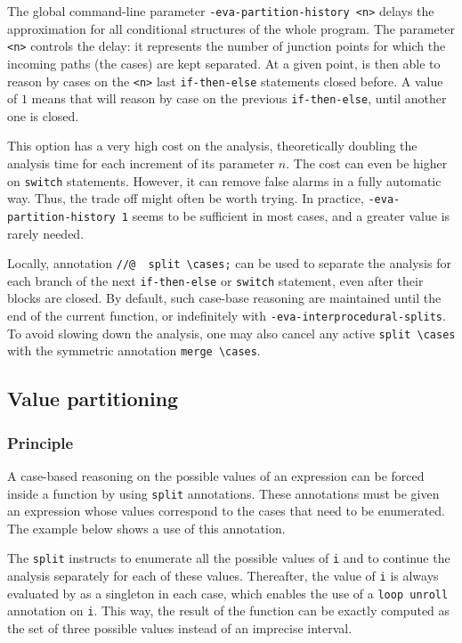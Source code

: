 \documentclass{frama-c-book}
\begin{document}
The global command-line parameter \lstinline|-eva-partition-history <n>|
delays the approximation for all conditional structures of the whole
program. The parameter \lstinline|<n>| controls the delay:
it represents the number of junction points for which the incoming
paths (the cases) are kept separated. At a given point, \Eva{} is then able to
reason by cases on the \lstinline|<n>| last \lstinline|if-then-else| statements
closed before.
A value of $1$ means that \Eva{} will reason by
case on the previous \lstinline|if-then-else|, until another one is closed.

This option has a very high cost on the analysis, theoretically doubling the
analysis time for each increment of its parameter $n$.
The cost can even be higher on \lstinline|switch| statements.
However, it can remove false alarms in a fully automatic way. Thus,
the trade off might often be worth trying.
In practice, \lstinline|-eva-partition-history 1| seems to be sufficient in
most cases, and a greater value is rarely needed.

Locally, annotation \lstinline|//@  split \cases;| can be used to separate the
analysis for each branch of the next \lstinline|if-then-else| or
\lstinline|switch| statement, even after their blocks are closed.
By default, such case-base reasoning are maintained until the end of the current
function, or indefinitely with \lstinline|-eva-interprocedural-splits|.
To avoid slowing down the analysis, one may also cancel any active
\lstinline|split \cases| with the symmetric annotation \lstinline|merge \cases|.

\subsection{Value partitioning}
\label{value-partitioning}

\subsubsection{Principle}

A case-based reasoning on the possible values of an expression can be forced
inside a function by using \lstinline|split| annotations.  These annotations
must be given an expression whose values correspond to the cases that need to be
enumerated. The example below shows a use of this annotation.


The \lstinline|split| instructs \Eva{} to enumerate all the possible
values of \lstinline|i| and to continue the analysis separately for
each of these values. Thereafter, the value of \lstinline|i| is always
evaluated by \Eva{} as a singleton in each case, which enables the use of a
\lstinline|loop unroll| annotation on \lstinline|i|. This way, the result of
the function can be exactly computed as the set of three possible values instead
of an imprecise interval.
\end{document}
